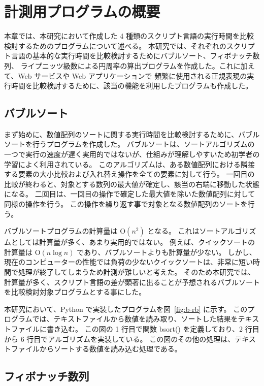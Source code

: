 \chapter{計測用プログラムの概要}
\label{cha:program}

本章では、本研究において作成した 4 種類のスクリプト言語の実行時間を比較検討するためのプログラムについて述べる。 
本研究では、それぞれのスクリプト言語の基本的な実行時間を比較検討するためにバブルソート、フィボナッチ数列、
ライプニッツ級数による円周率の算出プログラムを作成した。これに加えて、Web サービスや Web アプリケーションで
頻繁に使用される正規表現の実行時間を比較検討するために、該当の機能を利用したプログラムも作成した。

\section{バブルソート}
\label{cha:program:sort}

まず始めに、数値配列のソートに関する実行時間を比較検討するために、バブルソートを行うプログラムを作成した。
バブルソートは、ソートアルゴリズムの一つで実行の速度が遅く実用的ではないが、仕組みが理解しやすいため初学者の学習によく利用されている。
このアルゴリズムは、ある数値配列における隣接する要素の大小比較および入れ替え操作を全ての要素に対して行う。
一回目の比較が終わると、対象とする数列の最大値が確定し、該当の右端に移動した状態になる。
二回目は、一回目の操作で確定した最大値を除いた数値配列に対して同様の操作を行う。
この操作を繰り返す事で対象となる数値配列のソートを行う。

バブルソートプログラムの計算量は O$(n^{2})$ となる。
これはソートアルゴリズムとしては計算量が多く、あまり実用的ではない。
例えば、クイックソートの計算量は O$(n\log{n})$ であり、バブルソートよりも計算量が少ない。
しかし、現在のコンピューターの性能では負荷の少ないクイックソートは、非常に短い時間で処理が終了してしまうため計測が難しいと考えた。
そのため本研究では、計算量が多く、スクリプト言語の差が顕著に出ることが予想されるバブルソートを比較検討対象プログラムとする事にした。

本研究において、Python で実装したプログラムを図~\ref{fig:b-rb} に示す。
このプログラムでは、テキストファイルから数値を読み取り、ソートした結果をテキストファイルに書き込む。
この図の 1 行目で関数 bsort() を定義しており、2 行目から 6 行目でアルゴリズムを実装している。
この図のその他の処理は、テキストファイルからソートする数値を読み込む処理である。

\section{フィボナッチ数列}
\label{cha:program:fibonacci}

